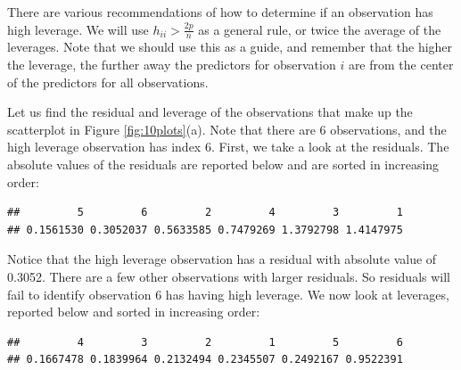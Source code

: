 \documentclass[
]{book}
\newenvironment{Shaded}{\begin{snugshade}}{\end{snugshade}}
\newcommand{\DocumentationTok}[1]{\textcolor[rgb]{0.56,0.35,0.01}{\textbf{\textit{#1}}}}
\newcommand{\FunctionTok}[1]{\textcolor[rgb]{0.13,0.29,0.53}{\textbf{#1}}}
\newcommand{\NormalTok}[1]{#1}
\newcommand{\SpecialCharTok}[1]{\textcolor[rgb]{0.81,0.36,0.00}{\textbf{#1}}}
\begin{document}
There are various recommendations of how to determine if an observation has high leverage. We will use \(h_{ii} > \frac{2p}{n}\) as a general rule, or twice the average of the leverages. Note that we should use this as a guide, and remember that the higher the leverage, the further away the predictors for observation \(i\) are from the center of the predictors for all observations.

Let us find the residual and leverage of the observations that make up the scatterplot in Figure \ref{fig:10plots}(a). Note that there are 6 observations, and the high leverage observation has index 6. First, we take a look at the residuals. The absolute values of the residuals are reported below and are sorted in increasing order:

\begin{Shaded}
\end{Shaded}

\begin{verbatim}
##         5         6         2         4         3         1 
## 0.1561530 0.3052037 0.5633585 0.7479269 1.3792798 1.4147975
\end{verbatim}

Notice that the high leverage observation has a residual with absolute value of 0.3052. There are a few other observations with larger residuals. So residuals will fail to identify observation 6 has having high leverage. We now look at leverages, reported below and sorted in increasing order:

\begin{Shaded}
\end{Shaded}

\begin{verbatim}
##         4         3         2         1         5         6 
## 0.1667478 0.1839964 0.2132494 0.2345507 0.2492167 0.9522391
\end{verbatim}
\end{document}
